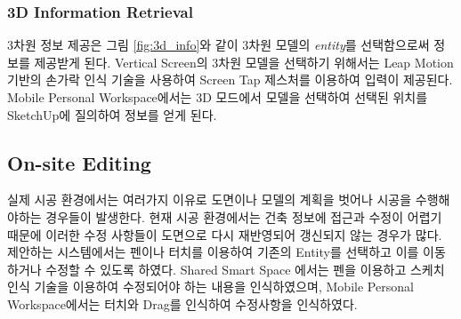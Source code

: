 \subsubsection{3D Information Retrieval}
3차원 정보 제공은 그림 \ref{fig:3d_info}와 같이 3차원 모델의 \textit{entity}를 선택함으로써 정보를 제공받게 된다. Vertical Screen의 3차원 모델을 선택하기 위해서는 Leap Motion 기반의 손가락 인식 기술을 사용하여 Screen Tap 제스처를 이용하여 입력이 제공된다. Mobile Personal Workspace에서는 3D 모드에서 모델을 선택하여 선택된 위치를 SketchUp에 질의하여 정보를 얻게 된다.


\subsection{On-site Editing}

실제 시공 환경에서는 여러가지 이유로 도면이나 모델의 계획을 벗어나 시공을 수행해야하는 경우들이 발생한다. 현재 시공 환경에서는 건축 정보에 접근과 수정이 어렵기 때문에 이러한 수정 사항들이 도면으로 다시 재반영되어 갱신되지 않는 경우가 많다. 제안하는 시스템에서는 펜이나 터치를 이용하여 기존의 Entity를 선택하고 이를 이동하거나 수정할 수 있도록 하였다. Shared Smart Space 에서는 펜을 이용하고 스케치 인식 기술을 이용하여 수정되어야 하는 내용을 인식하였으며, Mobile Personal Workspace에서는 터치와 Drag를 인식하여 수정사항을 인식하였다.

